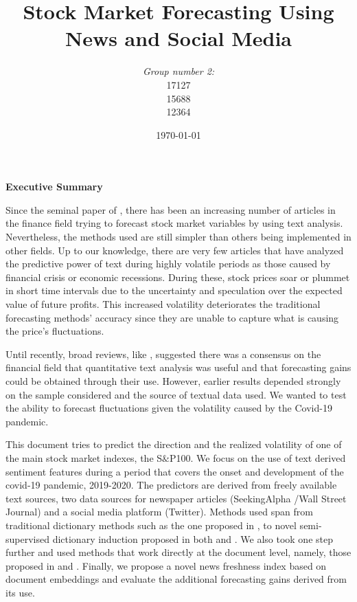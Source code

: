 \documentclass[a4paper, 12pt]{report}
\institute{London School of Economics and Political Science}
\title{Stock Market Forecasting Using News and Social Media}
\author{\textit{Group number 2:}\\17127\\15688\\12364}
\date{\today}
\begin{document}
    \maketitle
    \tableofcontents
    \listoffigures
    \listoftables
    \newpage
    
    
    \Huge{\textbf{Executive Summary}}

    \normalsize
    
    
    Since the seminal paper of \textcite{Tetlock:2008}, there has been an increasing number of articles in the finance field trying to forecast stock market variables by using text analysis. Nevertheless, the methods used are still simpler than others being implemented in other fields. Up to our knowledge, there are very few articles that have analyzed the predictive power of text during highly volatile periods as those caused by financial crisis or economic recessions. During these, stock prices soar or plummet in short time intervals due to the uncertainty and speculation over the expected value of future profits. This increased volatility deteriorates the traditional forecasting methods’ accuracy since they are unable to capture what is causing the price’s fluctuations.
    
    Until recently, broad reviews, like  \textcite{Kearney:2014}, suggested there was a consensus on the financial field that quantitative text analysis was useful and that forecasting gains could be obtained through their use. However, earlier results depended strongly on the sample considered and the source of textual data used. We wanted to test the ability to forecast fluctuations given the volatility caused by the Covid-19 pandemic.
     
    
    This document tries to predict the direction and the realized volatility of one of the main stock market indexes, the S$\&$P100. We focus on the use of text derived sentiment features during a period that covers the onset and development of the covid-19 pandemic, 2019-2020. The predictors are derived from freely available text sources, two data sources for newspaper articles (SeekingAlpha /Wall Street Journal) and a social media platform (Twitter). Methods used span from traditional dictionary methods such as the one proposed in \textcite{Loughran:2011}, to novel semi-supervised dictionary induction proposed in both \textcite{An:2018} and \textcite{Hamilton:2016}. We also took one step further and used methods that work directly at the document level, namely, those proposed in \textcite{Gupta:2020} and \textcite{Le:2014}. Finally, we propose a novel news freshness index based on document embeddings and evaluate the additional forecasting gains derived from its use.
    
\end{document}
